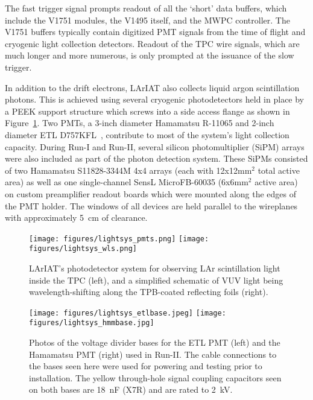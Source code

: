 The fast trigger signal prompts readout of all the `short' data buffers, which include the V1751 modules, the V1495 itself, and the MWPC controller.  The V1751 buffers typically contain digitized PMT signals from the time of flight and cryogenic light collection detectors. Readout of the TPC wire signals, which are much longer and more numerous, is only prompted at the issuance of the slow trigger.

In addition to the drift electrons, LArIAT also collects liquid argon scintillation photons.  This is achieved using several cryogenic photodetectors held in place by a PEEK support structure which screws into a side access flange as shown in Figure~\ref{lightsys_pmts}.  Two PMTs, a 3-inch diameter Hamamatsu R-11065 and 2-inch diameter ETL D757KFL~\cite{lightsys-pmttests}, contribute to most of the system's light collection capacity.  During Run-I and Run-II, several silicon photomultiplier (SiPM) arrays were also included as part of the photon detection system.  These SiPMs consisted of two Hamamatsu S11828-3344M 4x4 arrays (each with 12x12mm$^2$ total active area) as well as one single-channel SensL MicroFB-60035 (6x6mm$^2$ active area) on custom preamplifier readout boards which were mounted along the edges of the PMT holder.  The windows of all devices are held parallel to the wireplanes with approximately 5~cm of clearance.

\begin{figure}
\centering
\texttt{[image: figures/lightsys\_pmts.png]}
\hspace{1cm}
\texttt{[image: figures/lightsys\_wls.png]}
\caption{LArIAT's photodetector system for observing LAr scintillation light inside the TPC (left), and a simplified schematic of VUV light being wavelength-shifting along the TPB-coated reflecting foils (right).}
\label{lightsys_pmts}
\end{figure}
\begin{figure}
\centering
\texttt{[image: figures/lightsys\_etlbase.jpeg]}
\hspace{0.5cm}
\texttt{[image: figures/lightsys\_hmmbase.jpg]}
\caption{\label{voltagedividers}Photos of the voltage divider bases for the ETL PMT (left) and the Hamamatsu PMT (right) used in Run-II.  The cable connections to the bases seen here were used for powering and testing prior to installation.  The yellow through-hole signal coupling capacitors seen on both bases are 18~nF (X7R) and are rated to 2~kV.}
\end{figure}



